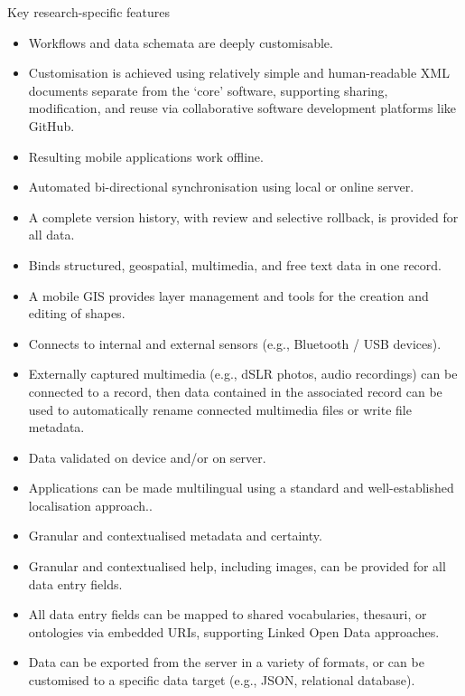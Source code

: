 \documentclass[aspectratio=169, 12pt]{beamer} %
\begin{document}
\begin{frame}[allowframebreaks]{Key research-specific features}
    \begin{itemize}[label=\textbullet]
        \item Workflows and data schemata are deeply customisable.
        \item Customisation is achieved using relatively simple and human-readable XML documents separate from the ‘core’ software, supporting sharing, modification, and reuse via collaborative software development platforms like GitHub.
        \item Resulting mobile applications work offline.
        \item Automated bi-directional synchronisation using local or online server.
        \item A complete version history, with review and selective rollback, is provided for all data.
        \item Binds structured, geospatial, multimedia, and free text data in one record.
        \item A mobile GIS provides layer management and tools for the creation and editing of shapes.
        \item Connects to internal and external sensors (e.g., Bluetooth / USB devices).
        \item Externally captured multimedia (e.g., dSLR photos, audio recordings) can be connected to a record, then data contained in the associated record can be used to automatically rename connected multimedia files or write file metadata.
        \item Data validated on device and/or on server.
        \item Applications can be made multilingual using a standard and well-established localisation approach..
        \item Granular and contextualised metadata and certainty.
        \item Granular and contextualised help, including images, can be provided for all data entry fields.
        \item All data entry fields can be mapped to shared vocabularies, thesauri, or ontologies via embedded URIs, supporting Linked Open Data approaches.
        \item Data can be exported from the server in a variety of formats, or can be customised to a specific data target (e.g., JSON, relational database).
    \end{itemize}
\end{frame}
\end{document}
